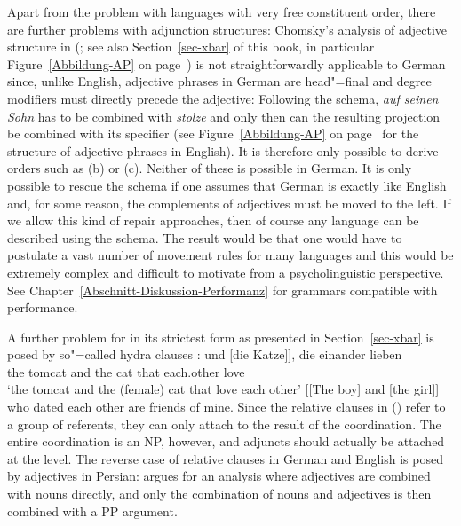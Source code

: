 \addlines[2]
Apart from the problem with languages with very free constituent order, there are further problems with adjunction structures: Chomsky's analysis of adjective structure
in \xbart (\citealp[]{Chomsky70a}; see also Section~\ref{sec-xbar} of this book, in
particular Figure~\ref{Abbildung-AP} on page~\pageref{Abbildung-AP}) is not straightforwardly applicable to German since, unlike
English, adjective phrases in German are head"=final and degree modifiers must directly precede the
adjective: 
\eal
{}
\zl
Following the \xbar schema, \emph{auf seinen Sohn} has to be combined with \emph{stolze} and only then can the
resulting \abar projection be combined with its specifier (see Figure~\ref{Abbildung-AP} on page~\pageref{Abbildung-AP} for the structure of adjective
phrases in English). It is therefore only possible to derive orders such as (b) or (c). Neither of these
is possible in German. It is only possible to rescue the \xbar schema if one assumes that German is
exactly like English and, for some reason, the complements of adjectives must be moved to the left. If we allow this kind of repair
approaches, then of course any language can be described using the \xbar schema. The result would be that one would have
to postulate a vast number of movement rules for many languages and this would be extremely complex and difficult
to motivate from a psycholinguistic perspective. See Chapter~\ref{Abschnitt-Diskussion-Performanz} for grammars compatible with performance.

A further problem for \xbart in its strictest form as presented in Section~\ref{sec-xbar} is posed
by so"=called hydra clauses \parencites{PR70a}{Link84a-u}{Kiss2005a}:
\eal
\ex {}
\gll [[der Kater] und [die Katze]], die einander lieben\\
     \spacebr{}\spacebr{}the tomcat and the cat that each.other love\\
\glt `the tomcat and the (female) cat that love each other'
\ex {}[[The boy] and [the girl]] who dated each other are friends of mine. 
\zl
Since the relative clauses in () refer to a group of referents, they can only attach to the result of the coordination.
The entire coordination is an NP, however, and adjuncts should actually be attached at the \xbar level. The reverse case of relative clauses
in German and English is posed by adjectives in Persian: \citet{Samvelian2007a} argues for an analysis where adjectives are combined with nouns
directly, and only the combination of nouns and adjectives is then combined with a PP argument.

